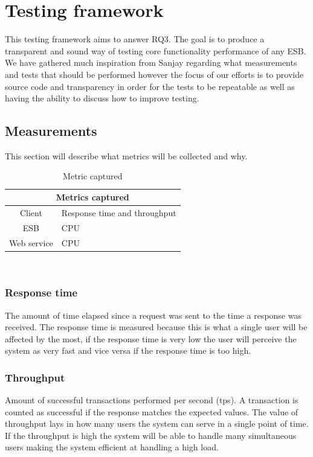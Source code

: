 

\section{Testing framework}
This testing framework aims to answer RQ3. The goal is to produce a transparent and sound way of testing core functionality \cite{lit review} performance of any ESB. 
We have gathered much inspiration from Sanjay \cite{Sanjay} regarding what measurements and tests that should be performed however the focus of our efforts is to provide source code and transparency in order for the tests to be repeatable as well as having the ability to discuss how to improve testing.

\subsection{Measurements}
This section will describe what metrics will be collected and why.\\

\begin{table}[H]
	\caption{Metric captured}
	\begin{tabular}{c l}
		\multicolumn{2}{c}{Metrics captured} \\
		\hline
		Client & Response time and throughput \\
		ESB & CPU \\ 
		Web service &  CPU \\
		\hline
	\end{tabular} \\
\end{table}

\subsubsection{Response time}
The amount of time elapsed since a request was sent to the time a response was received. 
The response time is measured because this is what a single user will be affected by the most, if the response time is very low the user will perceive the system as very fast and vice versa if the response time is too high.
\subsubsection{Throughput}
Amount of successful transactions performed per second (tps). A transaction is counted as successful if the response matches the expected values.
The value of throughput lays in how many users the system can serve in a single point of time. If the throughput is high the system will be able to handle many simultaneous users making the system efficient at handling a high load.



